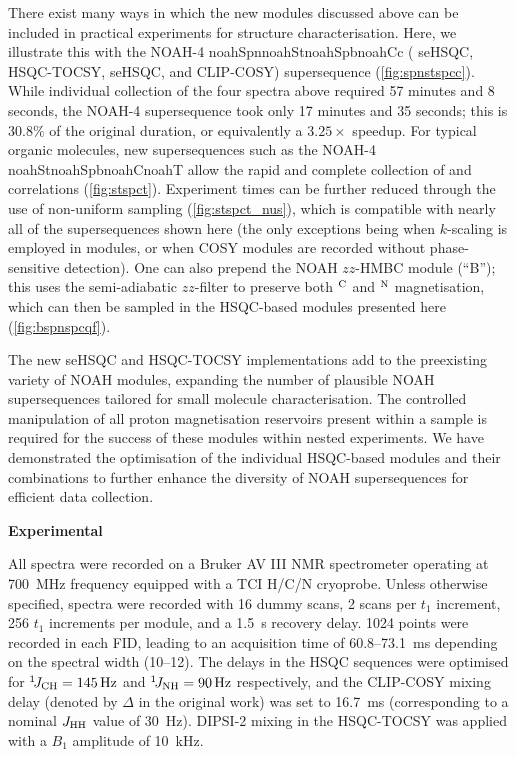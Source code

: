 \documentclass[11pt]{article}
\newcommand*{\noahfour}[4]{\csname noah#1\endcsname\csname noah#2\endcsname\csname noah#3\endcsname\csname noah#4\endcsname}
\newcommand*{\noahB}{B}
\newcommand*{\carbon}{\ce{^{13}C}}
\newcommand*{\proton}{\ce{^{1}H}}
\newcommand*{\nitrogen}{\ce{^{15}N}}
\newcommand*{\onejch}{{}^{1}\!J_{\ce{CH}}}
\newcommand*{\onejnh}{{}^{1}\!J_{\ce{NH}}}
\newcommand*{\magn}[1]{\ce{^1H}$^{#1}$}
\newcommand*{\jhh}{J_{\ce{HH}}}
\begin{document}
There exist many ways in which the new modules discussed above can be included in practical experiments for structure characterisation.
Here, we illustrate this with the NOAH-4 \noahfour{Spn}{St}{Spb}{Cc} (\nitrogen{} seHSQC, \carbon{} HSQC-TOCSY, \carbon{} seHSQC, and CLIP-COSY) supersequence (\cref{fig:spnstspcc}).
While individual collection of the four spectra above required 57 minutes and 8 seconds, the NOAH-4 supersequence took only 17 minutes and 35 seconds; this is $30.8\%$ of the original duration, or equivalently a $3.25\times$ speedup.
For typical organic molecules, new supersequences such as the NOAH-4 \noahfour{St}{Spb}{C}{T} allow the rapid and complete collection of  and  correlations (\cref{fig:stspct}).
Experiment times can be further reduced through the use of non-uniform sampling (\cref{fig:stspct_nus}), which is compatible with nearly all of the supersequences shown here (the only exceptions being when $k$-scaling is employed in \nitrogen{} modules, or when COSY modules are recorded without phase-sensitive detection).
One can also prepend the NOAH $zz$-HMBC module (``\noahB{}'');\autocite{Kupce2019JMR} this uses the semi-adiabatic $zz$-filter to preserve both \magn{\ce{C}} and \magn{\ce{N}} magnetisation, which can then be sampled in the HSQC-based modules presented here (\cref{fig:bspnspcqf}).



The new seHSQC and HSQC-TOCSY implementations add to the preexisting variety of NOAH modules, expanding the number of plausible NOAH supersequences tailored for small molecule characterisation.
The controlled manipulation of all proton magnetisation reservoirs present within a sample is required for the success of these modules within nested experiments.
We have demonstrated the optimisation of the individual HSQC-based modules and their combinations to further enhance the diversity of NOAH supersequences for efficient data collection.


\textbf{\Large Experimental}

All spectra were recorded on a Bruker AV III NMR spectrometer operating at \SI{700}{\MHz} \proton{} frequency equipped with a TCI H/C/N cryoprobe.
Unless otherwise specified, spectra were recorded with 16 dummy scans, 2 scans per $t_1$ increment, 256 $t_1$ increments per module, and a \SI{1.5}{\s} recovery delay.
1024 points were recorded in each FID, leading to an acquisition time of 60.8--\SI{73.1}{\ms} depending on the \proton{} spectral width (10--\SI{12}{\ppm}).
The delays in the HSQC sequences were optimised for $\onejch = \SI{145}{\Hz}$ and $\onejnh = \SI{90}{\Hz}$ respectively, and the CLIP-COSY mixing delay (denoted by $\Delta$ in the original work\autocite{Koos2016ACIE}) was set to \SI{16.7}{\ms} (corresponding to a nominal $\jhh$ value of \SI{30}{Hz}).
DIPSI-2 mixing in the HSQC-TOCSY was applied with a $B_1$ amplitude of \SI{10}{\kHz}.
\end{document}
